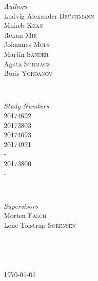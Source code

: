 \documentclass[12p]{article}
\begin{document}
\begin{titlepage}
	\begin{minipage}{0.4\textwidth}
    \begin{flushleft} \large
    \emph{Authors}\\
        Ludvig Alexander \textsc{Brüchmann} \\
        Muheb \textsc{Khan} \\
    	Rehan \textsc{Mir} \\
    	Johannes \textsc{Mols} \\
    	Martin \textsc{Sander} \\
    	Agata \textsc{Surmacz} \\
    	Boris \textsc{Yordanov} \\
    \end{flushleft}
    \end{minipage}
    ~
    \begin{minipage}{0.4\textwidth}
    \begin{flushright} \large
    \emph{Study Numbers} \\
        20174692 \\
        20173803 \\
        20174693 \\
        20174921 \\
        - \\
        20173800 \\
        - \\
    \end{flushright}
    \end{minipage}\\[0.5cm]
    
    
    \begin{minipage}{0.4\textwidth}
    \begin{flushleft} \large
    \emph{Supervisors}\\
        Morten \textsc{Falch} \\
        Lene Tolstrup \textsc{Sørensen} \\
    \end{flushleft}
    \end{minipage}
    ~
    \begin{minipage}{0.4\textwidth}
    \begin{flushright} \large
    \end{flushright}
    \end{minipage}\\[0.5cm]

	
	\vfill\vfill\vfill %
	
	{\large\today} %
	
    
\end{titlepage}
\end{document}
